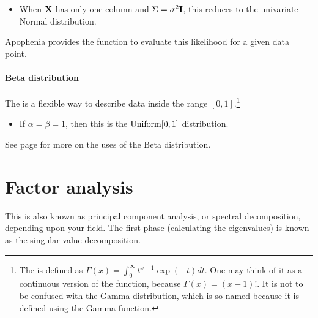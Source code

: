 
\begin{itemize}
\item When ${\bf X}$ has only one column and $\Sigma = \sigma^2{\bf I}$,
this reduces to the univariate Normal distribution.
\end{itemize}

Apophenia provides the function 
to evaluate this likelihood for a given data point.

\paragraph{Beta distribution} The  is a flexible
way to describe data inside the range $[0, 1]$.\footnote{The  is defined as $\Gamma(x) = \int_0^\infty  t^{x-1} \exp(-t)
dt$. One may think of it as a continuous version of the 
function, because $\Gamma(x) = (x-1)!$. It is not to be confused with
the Gamma distribution, which is so named because it is defined using
the Gamma function.}

\begin{itemize}
\item If $\alpha = \beta = 1$, then this is the ${\rm Uniform}[0,1]$ distribution.
\end{itemize}

See page \pageref{beta} for more on the uses of the Beta distribution.



\section{Factor analysis} \label{pca} 
This is also known as principal component
analysis, or spectral decomposition, depending upon your field. 
The first phase (calculating the eigenvalues) is known as the singular value decomposition.

